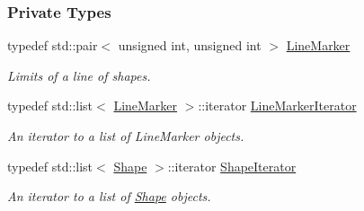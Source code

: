 \subsubsection*{Private Types}
\begin{CompactItemize}
\item 
typedef std::pair$<$ unsigned int, unsigned int $>$ \hyperlink{class_segmenter_ae134abed2f1d55197820f4027d10999}{LineMarker}
\begin{CompactList}\small\item\em Limits of a line of shapes. \item\end{CompactList}\item 
typedef std::list$<$ \hyperlink{class_segmenter_ae134abed2f1d55197820f4027d10999}{LineMarker} $>$::iterator \hyperlink{class_segmenter_b3190459e52101e495e49e936bbb6440}{LineMarkerIterator}
\begin{CompactList}\small\item\em An iterator to a list of LineMarker objects. \item\end{CompactList}\item 
typedef std::list$<$ \hyperlink{class_shape}{Shape} $>$::iterator \hyperlink{class_segmenter_1190be7ec081a96ee2ae91e0bb256a0d}{ShapeIterator}
\begin{CompactList}\small\item\em An iterator to a list of \hyperlink{class_shape}{Shape} objects. \item\end{CompactList}\end{CompactItemize}
